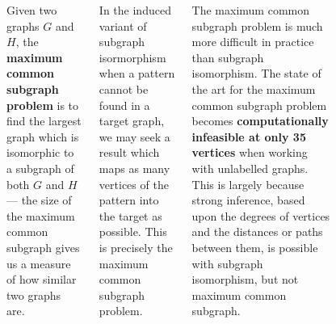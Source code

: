 \documentclass[a0paper]{tikzposter}
\begin{document}
\begin{columns}
{\begin{figure}
\begin{center}
\end{center}
\end{figure}

Given two graphs $G$ and $H$, the \textbf{maximum common subgraph problem} is to find the largest graph which is isomorphic to
a subgraph of both $G$ and $H$ --- the size of the maximum common subgraph gives us a measure of how similar two graphs are.

\bigskip

In the induced variant of subgraph isormorphism when a pattern cannot be found in a target graph, we may seek a result which maps as many vertices of the pattern into the target as possible.  This is precisely the maximum common subgraph problem.

\bigskip

The maximum common subgraph problem is much more difficult in practice than subgraph isomorphism.
The state of the art for the maximum common subgraph
problem becomes \textbf{computationally
infeasible at only 35 vertices} when working with
unlabelled graphs. This is largely because strong inference,
based upon the degrees of vertices and the
distances or paths between them, is possible with subgraph isomorphism,
but not maximum common subgraph.}


\end{columns}
\end{document}
